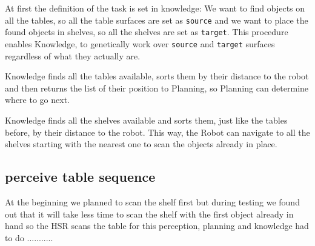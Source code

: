 \documentclass[main.tex]{subfiles}
\begin{document}
	At first the definition of the task is set in knowledge: We want to find objects on all the tables, so all the table surfaces are set as \texttt{source} and we want to place the found objects in shelves, so all the shelves are set as \texttt{target}. This procedure enables Knowledge, to genetically work over \texttt{source} and \texttt{target} surfaces regardless of what they actually are.
	
	
	
Knowledge finds all the tables available, sorts them by their distance to the robot and then returns the list of their position to Planning, so Planning can determine where to go next.
	
	
	
	
	
	
	
	
	
Knowledge finds all the shelves available and sorts them, just like the tables before, by their distance to the robot. This way, the Robot can navigate to all the shelves starting with the nearest one to scan the objects already in place.
	
	
	
	
	
	
	
	

	\subsection{perceive table sequence}
	At the beginning we planned to scan the shelf first but during testing we found out that it will take less time to scan the shelf with the first object already in hand so the HSR scans the table for this perception, planning and knowledge had to do ...........
\end{document}
